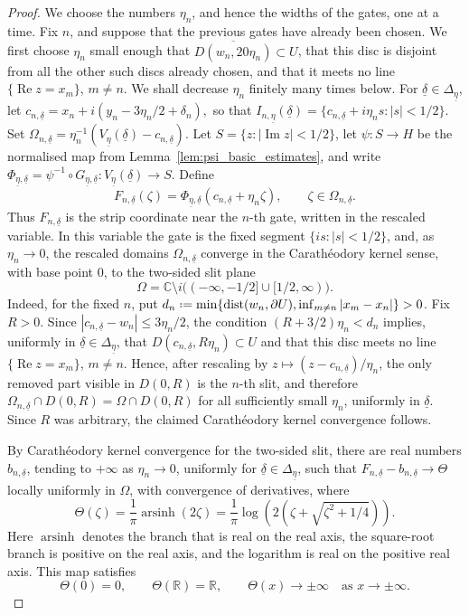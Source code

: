 \documentclass[10pt,a4paper]{amsart}
\newcommand{\C}{{\mathbb{C}}}
\newcommand{\Ima}{\operatorname{Im }}
\newcommand{\R}{{\mathbb{R}}}
\newcommand{\Rea}{\operatorname{Re }}
\newcommand*{\defeq}{\mathrel{\vcenter{\baselineskip0.5ex \lineskiplimit0pt
 \hbox{\scriptsize.}\hbox{\scriptsize.}}}=}
\newcommand{\dist}{\operatorname{dist}}
\newcommand{\uldelta}{\underline{\delta}}
\newcommand{\uleta}{\underline{\eta}}
\begin{document}
\begin{proof}
	We choose the numbers \(\eta_n\), and hence the widths of the gates, one at a time. Fix \(n\), and suppose that the previous
	gates have already been chosen. We first choose \(\eta_n\) small enough that
	\(\overline{D(w_n,20\eta_n)}\subset U\), that this disc is disjoint from all
	the other such discs already chosen, and that it meets no line
	\(\{\Rea z=x_m\}\), \(m\ne n\). We shall decrease \(\eta_n\) finitely many
	times below. For \(\uldelta\in\Delta_{\uleta}\), let
	$
	c_{n,\uldelta}
	=
	x_n+i(y_n-3\eta_n/2+\delta_n),
	$
	so that
	$
	I_{n,\uleta}(\uldelta)
	=
	\{c_{n,\uldelta}+i\eta_ns:|s|<1/2\}.
	$
	Set
	$
	\Omega_{n,\uldelta}
	=
	\eta_n^{-1}(V_{\uleta}(\uldelta)-c_{n,\uldelta}).
	$
	Let \(S=\{z:|\Ima z|<1/2\}\), let \(\psi:S\to H\) be the normalised map from
	Lemma~\ref{lem:psi_basic_estimates}, and write
	$
	\Phi_{\uleta,\uldelta}
	=
	\psi^{-1}\circ G_{\uleta,\uldelta}
	:
	V_{\uleta}(\uldelta)\to S .
	$
	Define
	\[
	F_{n,\uldelta}(\zeta)
	=
	\Phi_{\uleta,\uldelta}(c_{n,\uldelta}+\eta_n\zeta),
	\qquad
	\zeta\in\Omega_{n,\uldelta}.
	\]
	Thus \(F_{n,\uldelta}\) is the strip coordinate near the \(n\)-th gate,
	written in the rescaled variable. In this variable the gate is the fixed
	segment \(\{is:|s|<1/2\}\), and, as \(\eta_n\to0\), the rescaled domains
	\(\Omega_{n,\uldelta}\) converge in the Carath\'eodory kernel sense, with base point \(0\), to the two-sided slit plane
	\[
	\Omega
	=
	\C\setminus i\bigl((-\infty,-1/2]\cup[1/2,\infty)\bigr).
	\]
	Indeed, for the fixed \(n\), put
		\(d_n\defeq\min\{\dist(w_n,\partial U),\inf_{m\ne n}|x_m-x_n|\}>0\).
		Fix \(R>0\). Since \(|c_{n,\uldelta}-w_n|\le 3\eta_n/2\), the condition
		\((R+3/2)\eta_n<d_n\) implies, uniformly in
		\(\uldelta\in\Delta_{\uleta}\), that \(D(c_{n,\uldelta},R\eta_n)\subset U\)
		and that this disc meets no line \(\{\Rea z=x_m\}\), \(m\ne n\). Hence, after
		rescaling by \(z\mapsto (z-c_{n,\uldelta})/\eta_n\), the only removed part
		visible in \(D(0,R)\) is the \(n\)-th slit, and therefore
		\(\Omega_{n,\uldelta}\cap D(0,R)=\Omega\cap D(0,R)\) for all sufficiently
		small \(\eta_n\), uniformly in \(\uldelta\). Since \(R\) was arbitrary, the
		claimed Carath\'eodory kernel convergence follows.
	
	By Carath\'eodory kernel convergence for the two-sided slit, there are real
	numbers \(b_{n,\uldelta}\), tending to \(+\infty\) as \(\eta_n\to0\),
	uniformly for \(\uldelta\in\Delta_{\uleta}\), such that
	$
	F_{n,\uldelta}-b_{n,\uldelta}
	\longrightarrow
	\Theta
	$
	locally uniformly in \(\Omega\), with convergence of derivatives, where
	\[
	\Theta(\zeta)=
	\frac1\pi\operatorname{arsinh}(2\zeta)
	=
	\frac1\pi
	\log\left(2\left(\zeta+\sqrt{\zeta^2+1/4}\right)\right).
	\]
	Here \(\operatorname{arsinh}\) denotes the branch that is real on the real axis, the square-root branch is positive on the real axis, and the logarithm is real on the positive real axis. This map satisfies
	\[
	\Theta(0)=0,\qquad \Theta(\R)=\R,
	\qquad
	\Theta(x)\to\pm\infty
	\quad\text{as }x\to\pm\infty .
	\]
	

\end{proof}
\end{document}
